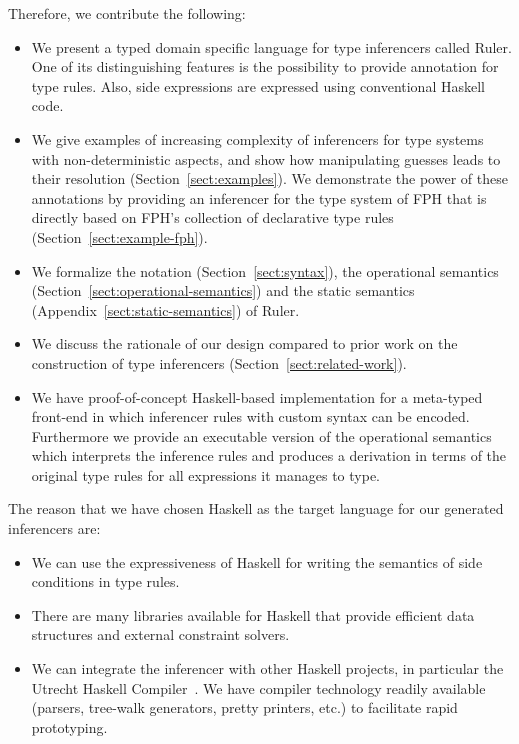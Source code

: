 \documentclass[preprint,natbib]{sigplanconf}
\begin{document}
Therefore, we contribute the following:
\begin{itemize} 
\item We present a typed domain specific language for type inferencers called Ruler. One of its distinguishing features is
  the possibility to provide annotation for type rules. Also, side expressions are expressed using conventional Haskell code.
\item We give examples of increasing complexity of inferencers for type systems with non-deterministic aspects,
  and show how manipulating guesses leads to their resolution (Section~\ref{sect:examples}). We demonstrate the power of these annotations by providing an inferencer for the type system of FPH \cite{DBLP:conf/icfp/VytiniotisWJ08} that is directly based on FPH's collection of declarative type rules (Section~\ref{sect:example-fph}).
\item We formalize the notation (Section~\ref{sect:syntax}), the operational semantics (Section~\ref{sect:operational-semantics}) and the static semantics (Appendix~\ref{sect:static-semantics}) of Ruler.
\item We discuss the rationale of our design compared to prior work on the construction of type inferencers (Section~\ref{sect:related-work}).
\item We have proof-of-concept Haskell-based implementation for a meta-typed front-end in which inferencer rules with custom syntax can be encoded.
  Furthermore we provide an executable version of the operational semantics which interprets the inference rules and produces a derivation
  in terms of the original type rules for all expressions it manages to type.
\end{itemize}

The reason that we have chosen Haskell as the target language for our generated inferencers are:
\begin{itemize}
\item We can use the expressiveness of Haskell for writing the semantics
  of side conditions in type rules.
\item There are many libraries available for Haskell that provide efficient data structures and external constraint solvers.
\item We can integrate the inferencer with other Haskell projects, in particular the Utrecht
  Haskell Compiler~\cite{DBLP:conf/ifl/DijkstraFS07}. We have compiler technology readily
  available (parsers, tree-walk generators, pretty printers, etc.) to facilitate
  rapid prototyping.
\end{itemize}
\end{document}
